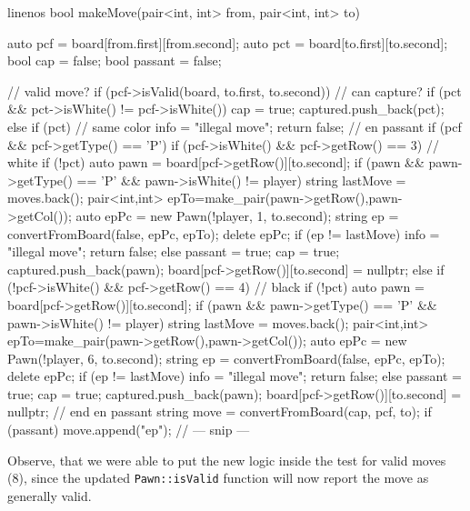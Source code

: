 \begin{cpp*}{linenos}
bool makeMove(pair<int, int> from, pair<int, int> to) {
  auto pcf = board[from.first][from.second];
  auto pct = board[to.first][to.second];
  bool cap = false;
  bool passant = false;

  // valid move?
  if (pcf->isValid(board, to.first, to.second)) {
    // can capture?
    if (pct && pct->isWhite() != pcf->isWhite()) {
      cap = true;
      captured.push_back(pct);
    } else if (pct) { // same color
      info = "illegal move";
      return false;
    }
    // en passant
    if (pcf && pcf->getType() == 'P') {
      if (pcf->isWhite() && pcf->getRow() == 3) { // white
        if (!pct) {
          auto pawn = board[pcf->getRow()][to.second];
          if (pawn && pawn->getType() == 'P' &&
              pawn->isWhite() != player)
          {
            string lastMove = moves.back();
            pair<int,int> epTo=make_pair(pawn->getRow(),pawn->getCol());
            auto epPc = new Pawn(!player, 1, to.second);
            string ep = convertFromBoard(false, epPc, epTo);
            delete epPc;
            if (ep != lastMove) {
              info = "illegal move";
              return false;
            } else {
              passant = true;
              cap = true;
              captured.push_back(pawn);
              board[pcf->getRow()][to.second] = nullptr;
            }
          }
        }
      } else if (!pcf->isWhite() && pcf->getRow() == 4) { // black
        if (!pct) {
          auto pawn = board[pcf->getRow()][to.second];
          if (pawn && pawn->getType() == 'P' &&
              pawn->isWhite() != player)
          {
            string lastMove = moves.back();
            pair<int,int> epTo=make_pair(pawn->getRow(),pawn->getCol());
            auto epPc = new Pawn(!player, 6, to.second);
            string ep = convertFromBoard(false, epPc, epTo);
            delete epPc;
            if (ep != lastMove) {
              info = "illegal move";
              return false;
            } else {
              passant = true;
              cap = true;
              captured.push_back(pawn);
              board[pcf->getRow()][to.second] = nullptr;
            }
          }
        }
      }
    } // end en passant
    string move = convertFromBoard(cap, pcf, to);
    if (passant) move.append("ep");
    // --- snip ---
  }
}
\end{cpp*}

Observe, that we were able to put the new logic inside the test for valid moves (8), since
the updated \texttt{Pawn::isValid} function will now report the move as generally valid.

